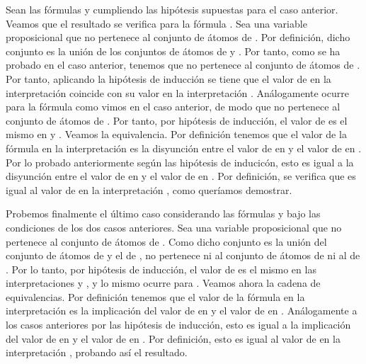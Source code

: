 \begin{isabellebody}
\begin{isamarkuptext}
\begin{demostracion}
  Sean las fórmulas  y  cumpliendo las hipótesis supuestas
  para el caso anterior. Veamos que el resultado se verifica para la
  fórmula . Sea  una variable proposicional que no pertenece
  al conjunto de átomos de . Por definición, dicho conjunto es
  la unión de los conjuntos de átomos de  y . Por tanto, como se
  ha probado en el caso anterior, tenemos que  no pertenece al
  conjunto de átomos de . Por tanto, aplicando la hipótesis de 
  inducción se tiene que el valor de  en la interpretación \isa{{\isasymA}} 
  coincide con su valor en la interpretación \isa{{\isasymA}{\isacharprime}}. Análogamente 
  ocurre para la fórmula  como vimos en el caso anterior, de modo
  que  no pertenece al conjunto de átomos de . Por tanto, por 
  hipótesis de inducción, el valor de  es el mismo en \isa{{\isasymA}} y \isa{{\isasymA}{\isacharprime}}.
  Veamos la equivalencia. 
  Por definición tenemos que el valor de la fórmula  en la 
  interpretación \isa{{\isasymA}{\isacharprime}} es la disyunción entre el valor de  en \isa{{\isasymA}{\isacharprime}}
  y el valor de  en \isa{{\isasymA}{\isacharprime}}. Por lo probado anteriormente según las 
  hipótesis de inducicón, esto es igual a la disyunción entre el valor 
  de  en \isa{{\isasymA}} y el valor de  en \isa{{\isasymA}}. Por definición, se 
  verifica que es igual al valor de  en la interpretación \isa{{\isasymA}}, 
  como queríamos demostrar.

  Probemos finalmente el último caso considerando las fórmulas  y
   bajo las condiciones de los dos casos anteriores. Sea  una 
  variable proposicional que no pertenece al conjunto de átomos de 
  . Como dicho conjunto es la unión del conjunto de átomos de
   y el de ,  no pertenece ni al conjunto de átomos de  ni
  al de . Por lo tanto, por hipótesis de inducción, el valor de  
  es el mismo en las interpretaciones \isa{{\isasymA}} y \isa{{\isasymA}{\isacharprime}}, y lo mismo ocurre 
  para . Veamos ahora la cadena de equivalencias. Por definición 
  tenemos que el valor de la fórmula  en la interpretación 
  \isa{{\isasymA}{\isacharprime}} es la implicación del valor de  en \isa{{\isasymA}{\isacharprime}} y el valor de 
  en \isa{{\isasymA}{\isacharprime}}. Análogamente a los casos anteriores por las hipótesis de 
  inducción, esto es igual a la implicación del valor de  en \isa{{\isasymA}} y 
  el valor de  en \isa{{\isasymA}}. Por definición, esto es igual al valor de 
   en la interpretación \isa{{\isasymA}}, probando así el resultado.
  \end{demostracion}


\end{isamarkuptext}
\end{isabellebody}
